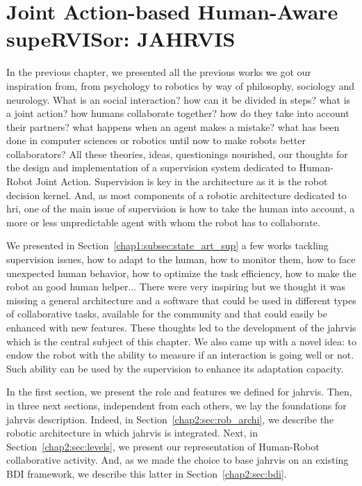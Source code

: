 \documentclass[a4paper,11pt,twoside]{StyleThese}
\begin{document}
\setcounter{chapter}{1} %
\dominitoc
\faketableofcontents
\fi

\chapter{Joint Action-based Human-Aware supeRVISor: JAHRVIS}
\label{chapter:chap2}
\minitoc

In the previous chapter, we presented all the previous works we got our inspiration from, from psychology to robotics by way of philosophy, sociology and neurology. What is an social interaction? how can it be divided in steps? what is a joint action? how humans collaborate together? how do they take into account their partners? what happens when an agent makes a mistake? what has been done in computer sciences or robotics until now to make robots better collaborators? All these theories, ideas, questionings nourished, our thoughts for the design and implementation of a supervision system dedicated to Human-Robot Joint Action. Supervision is key in the architecture as it is the robot decision kernel. And, as most components of a robotic architecture dedicated to \acrshort{hri}, one of the main issue of supervision is how to take the human into account, a more or less unpredictable agent with whom the robot has to collaborate. 

We presented in Section~\ref{chap1:subsec:state_art_sup} a few works tackling supervision issues, \ie how to adapt to the human, how to monitor them, how to face unexpected human behavior, how to optimize the task efficiency, how to make the robot an good human helper... There were very inspiring but we thought it was missing a general architecture and a software that could be used in different types of collaborative tasks, available for the community and that could easily be enhanced with new features. These thoughts led to the development of the \acrfull{jahrvis} which is the central subject of this chapter. We also came up with a novel idea: to endow the robot with the ability to measure if an interaction is going well or not. Such ability can be used by the supervision to enhance its adaptation capacity.

In the first section, we present the role and features we defined for \acrshort{jahrvis}. Then, in three next sections, independent from each others, we lay the foundations for \acrshort{jahrvis} description. Indeed, in Section~\ref{chap2:sec:rob_archi}, we describe the robotic architecture in which \acrshort{jahrvis} is integrated. Next, in Section~\ref{chap2:sec:levels}, we present our representation of Human-Robot collaborative activity. And, as we made the choice to base \acrshort{jahrvis} on an existing BDI framework, we describe this latter in Section~\ref{chap2:sec:bdi}. 
\end{document}

